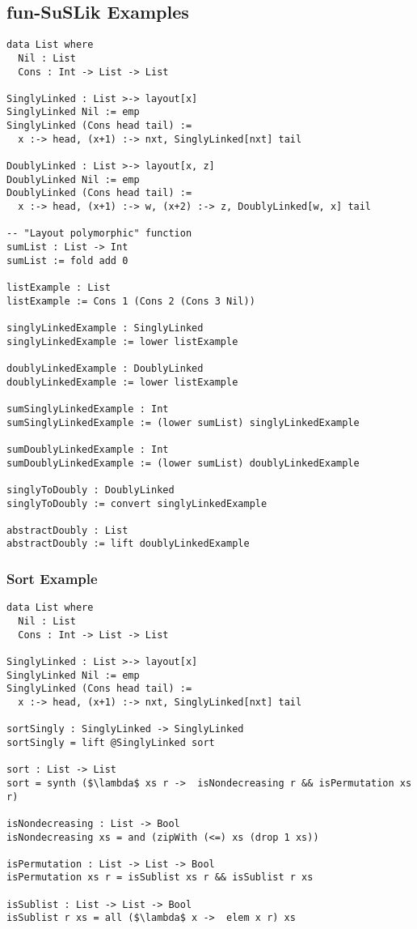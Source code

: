 \documentclass[10pt]{article}
\begin{document}
\subsection{fun-SuSLik Examples}

\begin{lstlisting}
data List where
  Nil : List
  Cons : Int -> List -> List

SinglyLinked : List >-> layout[x]
SinglyLinked Nil := emp
SinglyLinked (Cons head tail) :=
  x :-> head, (x+1) :-> nxt, SinglyLinked[nxt] tail

DoublyLinked : List >-> layout[x, z]
DoublyLinked Nil := emp
DoublyLinked (Cons head tail) := 
  x :-> head, (x+1) :-> w, (x+2) :-> z, DoublyLinked[w, x] tail

-- "Layout polymorphic" function
sumList : List -> Int
sumList := fold add 0

listExample : List
listExample := Cons 1 (Cons 2 (Cons 3 Nil))

singlyLinkedExample : SinglyLinked
singlyLinkedExample := lower listExample

doublyLinkedExample : DoublyLinked
doublyLinkedExample := lower listExample

sumSinglyLinkedExample : Int
sumSinglyLinkedExample := (lower sumList) singlyLinkedExample

sumDoublyLinkedExample : Int
sumDoublyLinkedExample := (lower sumList) doublyLinkedExample

singlyToDoubly : DoublyLinked
singlyToDoubly := convert singlyLinkedExample

abstractDoubly : List
abstractDoubly := lift doublyLinkedExample
\end{lstlisting}

\subsubsection{Sort Example}

\begin{lstlisting}
data List where
  Nil : List
  Cons : Int -> List -> List

SinglyLinked : List >-> layout[x]
SinglyLinked Nil := emp
SinglyLinked (Cons head tail) :=
  x :-> head, (x+1) :-> nxt, SinglyLinked[nxt] tail

sortSingly : SinglyLinked -> SinglyLinked
sortSingly = lift @SinglyLinked sort

sort : List -> List
sort = synth ($\lambda$ xs r ->  isNondecreasing r && isPermutation xs r)

isNondecreasing : List -> Bool
isNondecreasing xs = and (zipWith (<=) xs (drop 1 xs))

isPermutation : List -> List -> Bool
isPermutation xs r = isSublist xs r && isSublist r xs

isSublist : List -> List -> Bool
isSublist r xs = all ($\lambda$ x ->  elem x r) xs
\end{lstlisting}
\end{document}
